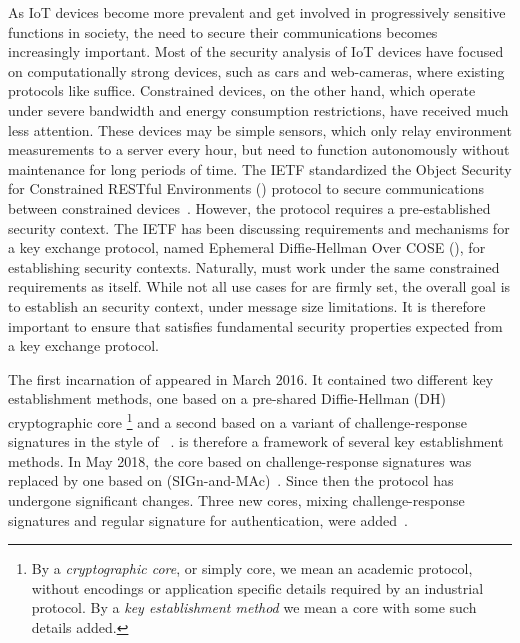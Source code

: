 \documentclass[a4paper,twoside,draft]{article}
\begin{document}
As IoT devices become more prevalent and get involved in progressively sensitive
functions in society, the need to secure their communications
becomes increasingly important.
%
Most of the security analysis of IoT devices have focused on computationally
strong devices, such as cars and web-cameras, where existing protocols like
\mDandTls{} suffice.
%
Constrained devices, on the other hand, which operate under severe
bandwidth and energy consumption restrictions, have received much less
attention.
%
These devices may be simple sensors, which only relay environment
measurements to a server every hour, but need to function autonomously without
maintenance for long periods of time.
%
The IETF standardized the Object Security for
Constrained RESTful Environments (\mOscore{}) protocol to secure communications
between constrained devices~\cite{rfc8613}.
%
However, the \mOscore{} protocol requires a pre-established security context.
%
The IETF has been discussing requirements and mechanisms for a key
exchange protocol, named Ephemeral Diffie-Hellman Over COSE (\mEdhoc), for
establishing \mOscore{} security contexts.
%
Naturally, \mEdhoc{} must work under the same constrained requirements as
\mOscore{} itself.
%
While not all use cases for \mEdhoc{} are firmly set, the overall goal is to
establish an \mOscore{} security context, under message size limitations.
%
It is therefore important to ensure that \mEdhoc{} satisfies fundamental
security properties expected from a key exchange protocol.
%

The first incarnation of \mEdhoc{} appeared in March 2016.
%
It contained two different key establishment methods, one based on a
pre-shared Diffie-Hellman (DH) cryptographic core%
\footnote{By a \emph{cryptographic core}, or simply core, we mean an academic protocol,
without encodings or application specific details required by an industrial
protocol.
%
By a \emph{key establishment method} we mean a core with some such details added.
}
and a second based on a
variant of challenge-response signatures in the style of 
\mOptls{}~\cite{DBLP:conf/eurosp/KrawczykW16}.
%
\mEdhoc{} is therefore a framework of several key establishment methods.
%
In May 2018, the core based on challenge-response signatures was replaced by
one based on \mSigma{} (SIGn-and-MAc)~\cite{sigma,bruni-analysis-selander-ace-cose-ecdhe-08}.
%
Since then the protocol has undergone significant changes.
%
Three new cores, mixing challenge-response signatures and regular signature for
authentication, were added~\cite{our-analysis-selander-lake-edhoc-00}.
%
\end{document}
